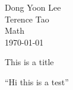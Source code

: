 \documentclass[12pt]{article}
\begin{document}
\begin{flushleft}
Dong Yoon Lee\\
Terence Tao\\
Math\\
\today
\end{flushleft}
\begin{center}
This is a title \citep{google}
\end{center}


``Hi this is a test''
\nocite{*}
\printbibliography
\end{document}
